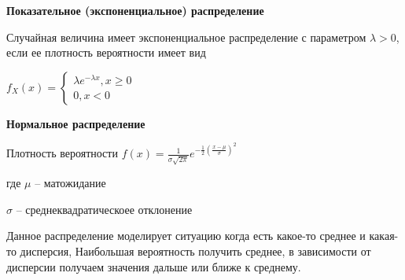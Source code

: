 {\bf Показательное (экспоненциальное) распределение}

Случайная величина имеет экспоненциальное распределение с параметром $\lambda > 0$, если ее плотность вероятности имеет вид

$f_X(x) = \begin{cases}
	\lambda e^{-\lambda x}, x \ge 0\\
	0, x < 0
\end{cases}$

{\bf Нормальное распределение}


Плотность вероятности $f(x) = \frac{1}{\sigma \sqrt{2 \pi}}e^{-\frac{1}{2}(\frac{x - \mu}{\sigma})^2}$

где $\mu$ -- матожидание

$\sigma$ -- среднеквадратическоее отклонение

Данное распределение моделирует ситуацию когда есть какое-то среднее и какая-то дисперсия, Наибольшая вероятность получить среднее, в зависимости от дисперсии получаем значения дальше или ближе к среднему.